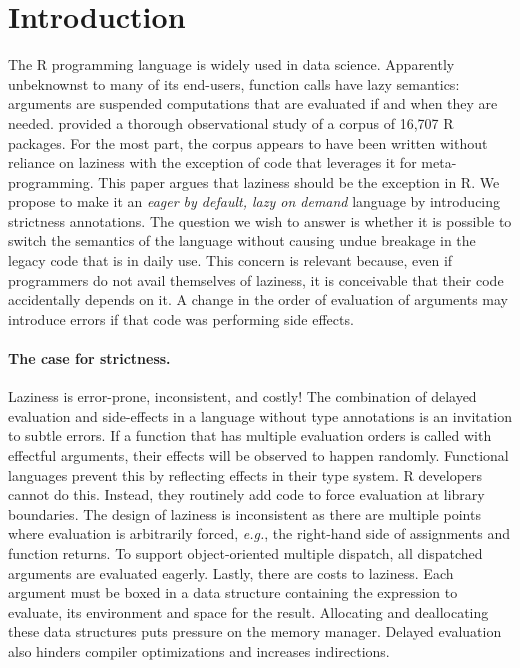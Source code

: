 \documentclass[review,creen,acmsmall]{acmart}
\newcommand{\eg}{\emph{e.g.},\xspace}
\begin{document}


\maketitle
\section{Introduction}

The R programming language is widely used in data science. Apparently
unbeknownst to many of its end-users, function calls have lazy semantics:
arguments are suspended computations that are evaluated if and when they are
needed. \citet{oopsla19b} provided a thorough observational study of a corpus of
16,707 R packages. For the most part, the corpus appears to have been written
without reliance on laziness with the exception of code that leverages it for
meta-programming. This paper argues that laziness should be the exception in R.
We propose to make it an \emph{eager by default, lazy on demand} language by
introducing strictness annotations. The question we wish to answer is whether it
is possible to switch the semantics of the language without causing undue
breakage in the legacy code that is in daily use. This concern is relevant
because, even if programmers do not avail themselves of laziness, it is
conceivable that their code accidentally depends on it. A change in the order of
evaluation of arguments may introduce errors if that code was performing side
effects.

\paragraph{The case for strictness.} Laziness is error-prone, inconsistent,
and costly! The combination of delayed evaluation and side-effects in a language
without type annotations is an invitation to subtle errors. If a function that
has multiple evaluation orders is called with effectful arguments, their effects
will be observed to happen randomly. Functional languages prevent this by reflecting
effects in their type system. R developers cannot do this. Instead, they
routinely add code to force evaluation at library boundaries. The design
of laziness is inconsistent as there are multiple points where evaluation
is arbitrarily forced, \eg the right-hand side of assignments and function
returns. To support object-oriented multiple dispatch, all dispatched arguments
are evaluated eagerly. Lastly, there are costs to laziness. Each argument must be
boxed in a data structure containing the expression to evaluate, its environment and
space for the result. Allocating and deallocating these data structures puts
pressure on the memory manager. Delayed evaluation also hinders compiler
optimizations and increases indirections.
\end{document}
